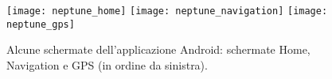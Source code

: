 \begin{figure}[htp]
	\centering
	\texttt{[image: neptune\_home]}\hfill
	\texttt{[image: neptune\_navigation]}\hfill
	\texttt{[image: neptune\_gps]}
	\caption[Neptune - versione Android]{Alcune schermate dell'applicazione Android: schermate Home, Navigation e GPS (in ordine da sinistra).}\label{xyz}
\end{figure}

